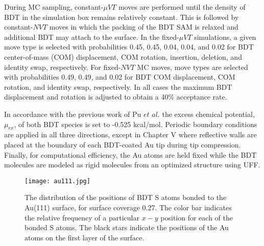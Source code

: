 \documentclass[10pt]{report}  %
\begin{document}
During MC sampling, constant-$\mu$$VT$ moves are performed until the density of BDT in the simulation box remains relatively constant. This is followed by constant-$NVT$ moves in which the packing of the BDT SAM is relaxed and additional BDT may attach to the surface. In the fixed-$\mu$$VT$ simulations, a given move type is selected with probabilities 0.45, 0.45, 0.04, 0.04, and 0.02 for BDT center-of-mass (COM)  displacement, COM rotation, insertion, deletion, and identity swap, respectively.  For fixed-$NVT$ MC moves, move types are selected with probabilities 0.49, 0.49, and 0.02 for BDT COM displacement, COM rotation, and identity swap, respectively. In all cases the maximum BDT displacement and rotation is adjusted to obtain a 40\% acceptance rate.   

In accordance with the previous work of Pu $et$ $al.$ \cite{Pu:2007} the excess chemical potential, $\mu_{ex}$, of both BDT species is set to -0.525 kcal/mol. Periodic boundary conditions are applied in all three directions, except in Chapter V where reflective walls are placed at the boundary of each BDT-coated Au tip during tip compression. Finally, for computational efficiency, the Au atoms are held fixed while the BDT molecules are modeled as rigid molecules from an optimized structure using UFF. \cite{Rappe:1992}

\begin{figure}[t]
	\centering
	\texttt{[image: au111.jpg]}
	\caption{The distribution of the positions of BDT S atoms bonded to the Au(111) surface, for surface coverage 0.27.  The color bar indicates the relative frequency of a particular $x-y$ position for each of the bonded S atoms.  The black stars indicate the positions of the Au atoms on the first layer of the surface.}
	\label{fig:au111}
\end{figure}
\end{document}
